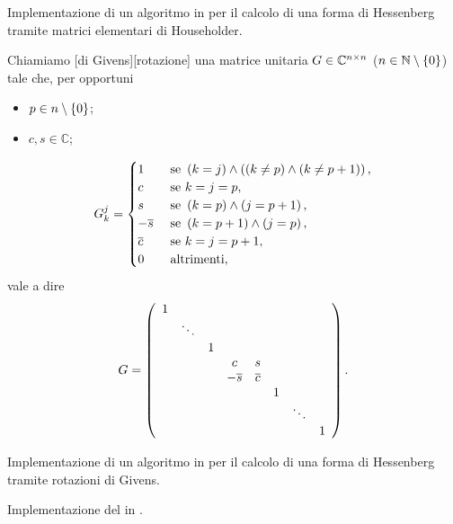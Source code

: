 \Proof 
\begin{listing}
	\caption{Implementazione di un algoritmo in  per il calcolo di una
  forma di Hessenberg tramite matrici elementari di Householder.}
\end{listing}
\begin{Definition}
  Chiamiamo
  [di Givens][rotazione]
  una matrice unitaria
  $G \in \mathbb{C}^{n \times n}$
  ($n \in \mathbb{N} \setminus \lbrace 0 \rbrace$) tale che, per opportuni
  \begin{itemize}
    \item $p \in n \setminus \lbrace 0 \rbrace$;
    \item $c, s \in \mathbb{C}$;
  \end{itemize}
  \[
    G_k^j =
    \begin{cases}
      1&\text{ se }\left ( k = j \right ) \wedge \left ( \left ( k \neq p \right ) \wedge \left ( k \neq p + 1 \right ) \right ),\\
      c&\text{ se }k = j = p,\\
      s&\text{ se }\left ( k = p \right ) \wedge \left ( j = p + 1 \right ),\\
      - \overline{s}&\text{ se }\left ( k = p + 1 \right ) \wedge \left ( j = p \right ),\\
      \overline{c}&\text{ se }k = j = p + 1,\\
      0&\text{ altrimenti},
    \end{cases}
  \]
  vale a dire
  \[
    G =
    \left (
    \begin{array}{cccccccccc}
      1 &&&&&&&\\
      & \ddots &&&&&&\\
      && 1 &&&&&\\
      &&& c & s &&&\\
      &&& - \overline{s} & \overline{c} &&&\\
      &&&&& 1 &&\\
      &&&&&& \ddots &\\
      &&&&&&& 1
    \end{array}
    \right ).
  \]
\end{Definition}
\begin{listing}
	\caption{Implementazione di un algoritmo in  per il calcolo di una
  forma di Hessenberg tramite rotazioni di Givens.}
\end{listing}
\begin{listing}
	\caption{Implementazione del  in .}
\end{listing}
